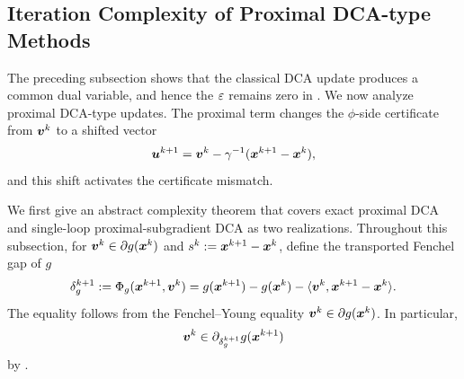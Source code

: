 \documentclass[english]{article}
\begin{document}

\subsection{Iteration Complexity of Proximal DCA-type Methods}
\label{subsec:prox-subgrad-dca}

The preceding subsection shows that the classical DCA update produces a
common dual variable, and hence the $\varepsilon$ remains zero in 
. We now analyze proximal
DCA-type updates. The proximal term changes the $\phi$-side certificate
from $\bm{v}^k$ to a shifted vector
\[
    \bm{u}^{k+1}
    =
    \bm{v}^k-\gamma^{-1}(\bm{x}^{k+1}-\bm{x}^k),
\]
and this shift activates the certificate mismatch. 

We first give an abstract complexity theorem that covers exact
proximal DCA and single-loop proximal-subgradient DCA as two
realizations. Throughout this subsection, for
$\bm{v}^k\in\partial g(\bm{x}^k)$ and $s^k:=\bm{x}^{k+1}-\bm{x}^k$, define the
transported Fenchel gap of $g$
\begin{equation}
    \delta_g^{k+1}
    :=
    \Phi_g(\bm{x}^{k+1},\bm{v}^k)
    =
    g(\bm{x}^{k+1})-g(\bm{x}^k)
    -\langle \bm{v}^k,\bm{x}^{k+1}-\bm{x}^k\rangle .
    \label{eq:prox-dca-transport-g-gap}
\end{equation}
The equality follows from the Fenchel--Young equality
$\bm{v}^k\in\partial g(\bm{x}^k)$. In particular,
\[
    \bm{v}^k\in\partial_{\delta_g^{k+1}} g(\bm{x}^{k+1})
\]
by .
\end{document}
